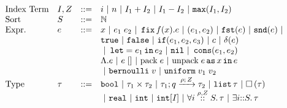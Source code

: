 \documentclass[a4paper,11pt]{article}
\theoremstyle{definition}
\begin{document}
\clearpage
\begin{figure}
\[
\begin{array}{llll}
\mbox{Index Term} & \idx, \nnatA & ::= &     i ~|~ n ~|~ \idx_1 + \idx_2 ~|~  \idx_1
                                 - \idx_2 ~|~ \smax{\idx_1}{\idx_2}\\
  \mbox{Sort} & S & ::= & \nat \\
\mbox{Expr.} & \expr & ::= & x ~|~ \expr_1 \eapp \expr_2 ~|~ \efix f(x).\expr
            ~|~ (\expr_1, \expr_2) ~|~ \eprojl(\expr) ~|~ \eprojr(\expr) ~| \\
%
& & &           \etrue ~|~ \efalse ~|~ \eif(\expr_1, \expr_2, \expr_3) 
            ~|~ \econst ~|~ \eop(\expr) \\
& & &           ~|~ \elet  = \expr_1 \ein \expr_2 ~|~ \enil ~|~  \econs (
                \expr_1, \expr_2)  \\
& & &  \eilam \expr  ~|~  \expr \eapp []  ~|~
                            \epack \expr ~|~ \eunpack \expr \eas x
                            \ein \expr \\
& & & ~|~ \bernoulli \eapp \valr ~|~ \uniform \eapp \valr_1 \eapp \valr_2\\      
%
  \mbox{Type} & \type & ::= & \tbool ~|~ \type_1 \times
  \type_2 ~|~ \tarr{\type_1}{\type_2}{\nnatbiA}{\dmap}{\nnatA} ~|~
                              \tlist{\type} ~|~ \tbox{\type}\\
& & &                 ~|~  \treal ~|~  \tint ~|~   \tint[I]  ~|~      \tforall{\dmap}{\nnatA}{i} \type  ~|~ \texists{i} \type
%
\end{array}
\]


\end{figure}
\end{document}
